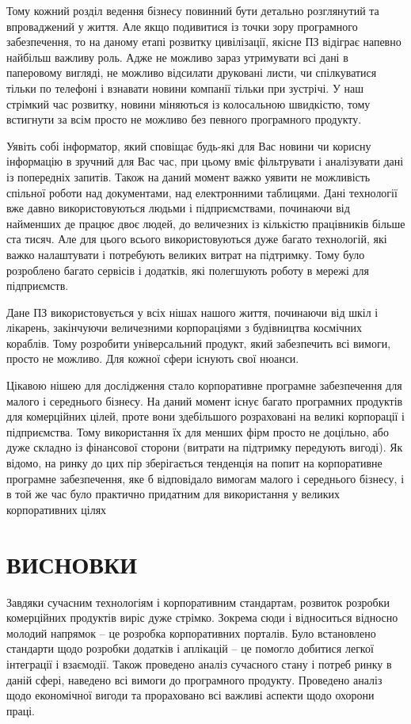 Тому кожний розділ ведення бізнесу повинний бути детально розглянутий та впроваджений у життя. 
Але якщо подивитися із точки зору програмного забезпечення, то на даному етапі розвитку цивілізації, якісне ПЗ відіграє напевно найбільш важливу роль. 
Адже не можливо зараз утримувати всі дані в паперовому вигляді, не можливо відсилати друковані листи, чи спілкуватися тільки по телефоні і взнавати новини компанії тільки при зустрічі. 
У наш стрімкий час розвитку, новини міняються із колосальною швидкістю, тому встигнути за всім просто не можливо без певного програмного продукту. 
\par Уявіть собі інформатор, який сповіщає будь-які для Вас новини чи корисну інформацію в зручний для Вас час, при цьому вміє фільтрувати і аналізувати дані із попередніх запитів. 
Також на даний момент важко уявити не можливість спільної роботи над документами, над електронними таблицями. 
Дані технології вже давно використовуються людьми і підприємствами, починаючи від найменших де працює двоє людей, до величезних із кількістю працівників більше ста тисяч. 
Але для цього всього використовуються дуже багато технологій, які важко налаштувати і потребують великих витрат на підтримку.
Тому було розроблено багато сервісів і додатків, які полегшують роботу в мережі для підприємств.
\par Дане ПЗ використовується у всіх нішах нашого життя, починаючи від шкіл і лікарень, закінчуючи величезними корпораціями з будівництва космічних кораблів. 
Тому розробити універсальний продукт, який забезпечить всі вимоги, просто не можливо. 
Для кожної сфери існують свої нюанси.
\par Цікавою нішею для дослідження стало корпоративне програмне забезпечення для малого і середнього бізнесу.
 На даний момент існує багато програмних продуктів для комерційних цілей, проте вони здебільшого розраховані на великі корпорації і підприємства.
Тому використання їх для менших фірм просто не доцільно, або дуже складно із фінансової сторони (витрати на підтримку передують вигоді).
Як відомо, на ринку до цих пір зберігається тенденція на попит на корпоративне програмне забезпечення, яке б відповідало вимогам малого і середнього бізнесу, і в той же час було практично придатним для використання у великих корпоративних цілях


% 
% 
% 
% 



\section*{ВИСНОВКИ}
Завдяки сучасним технологіям і корпоративним стандартам, розвиток розробки комерційних продуктів виріс дуже стрімко. 
Зокрема сюди і відноситься відносно молодий напрямок -- це розробка корпоративних порталів. 
Було встановлено стандарти щодо розробки додатків і аплікацій -- це помогло добитися легкої інтеграції і взаємодії. 
Також проведено аналіз сучасного стану і потреб ринку в даній сфері, наведено всі вимоги до програмного продукту.
Проведено аналіз щодо економічної вигоди та прораховано всі важливі аспекти щодо охорони праці.




